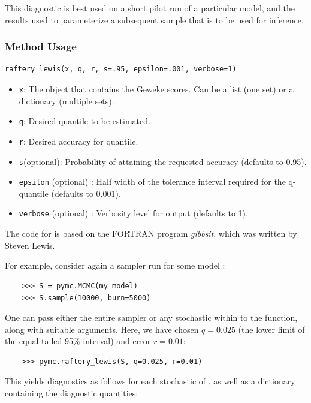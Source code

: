 This diagnostic is best used on a short pilot run of a particular model, and the results used to parameterize a subsequent sample that is to be used for inference.


\subsubsection*{Method Usage}
\begin{verbatim}
raftery_lewis(x, q, r, s=.95, epsilon=.001, verbose=1)
\end{verbatim}
\begin{itemize}

	\item \verb=x=: The object that contains the Geweke scores. Can be a list (one set) or a dictionary (multiple sets).

    \item \verb=q=: Desired quantile to be estimated.

    \item \verb=r=: Desired accuracy for quantile.

    \item \verb=s=(optional): Probability of attaining the requested accuracy (defaults to 0.95).

    \item \verb=epsilon= (optional) : Half width of the tolerance interval required for the q-quantile (defaults to 0.001).

    \item \verb=verbose= (optional) : Verbosity level for output (defaults to 1).
\end{itemize}

The code for  is based on the FORTRAN program \emph{gibbsit}, which was written by Steven Lewis.

For example, consider again a sampler  run for some model :
\begin{verbatim}
	>>> S = pymc.MCMC(my_model)
	>>> S.sample(10000, burn=5000)
\end{verbatim}
One can pass either the entire sampler  or any stochastic within  to the  function, along with suitable arguments. Here, we have chosen $q=0.025$ (the lower limit of the equal-tailed 95\% interval) and error $r=0.01$:
\begin{verbatim}
	>>> pymc.raftery_lewis(S, q=0.025, r=0.01)
\end{verbatim}
This yields diagnostics as follows for each stochastic of , as well as a dictionary containing the diagnostic quantities:

